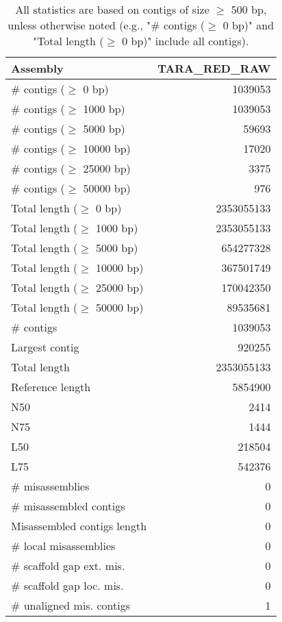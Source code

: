 \documentclass[12pt,a4paper]{article}
\begin{document}
\begin{table}[ht]
\begin{center}
\caption{All statistics are based on contigs of size $\geq$ 500 bp, unless otherwise noted (e.g., "\# contigs ($\geq$ 0 bp)" and "Total length ($\geq$ 0 bp)" include all contigs).}
\begin{tabular}{|l*{1}{|r}|}
\hline
Assembly & TARA\_RED\_RAW \\ \hline
\# contigs ($\geq$ 0 bp) & 1039053 \\ \hline
\# contigs ($\geq$ 1000 bp) & 1039053 \\ \hline
\# contigs ($\geq$ 5000 bp) & 59693 \\ \hline
\# contigs ($\geq$ 10000 bp) & 17020 \\ \hline
\# contigs ($\geq$ 25000 bp) & 3375 \\ \hline
\# contigs ($\geq$ 50000 bp) & 976 \\ \hline
Total length ($\geq$ 0 bp) & 2353055133 \\ \hline
Total length ($\geq$ 1000 bp) & 2353055133 \\ \hline
Total length ($\geq$ 5000 bp) & 654277328 \\ \hline
Total length ($\geq$ 10000 bp) & 367501749 \\ \hline
Total length ($\geq$ 25000 bp) & 170042350 \\ \hline
Total length ($\geq$ 50000 bp) & 89535681 \\ \hline
\# contigs & 1039053 \\ \hline
Largest contig & 920255 \\ \hline
Total length & 2353055133 \\ \hline
Reference length & 5854900 \\ \hline
N50 & 2414 \\ \hline
N75 & 1444 \\ \hline
L50 & 218504 \\ \hline
L75 & 542376 \\ \hline
\# misassemblies & 0 \\ \hline
\# misassembled contigs & 0 \\ \hline
Misassembled contigs length & 0 \\ \hline
\# local misassemblies & 0 \\ \hline
\# scaffold gap ext. mis. & 0 \\ \hline
\# scaffold gap loc. mis. & 0 \\ \hline
\# unaligned mis. contigs & 1 \\ \hline

\end{tabular}
\end{center}
\end{table}
\end{document}

